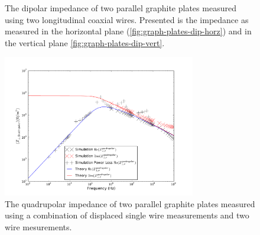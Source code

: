 \begin{figure}
\caption{The dipolar impedance of two parallel graphite plates measured using two longitudinal coaxial wires. Presented is the impedance as measured in the horizontal plane (\ref{fig:graph-plates-dip-horz}) and in the vertical plane \ref{fig:graph-plates-dip-vert}.}
\label{fig:graph-plates-dipolar}
\end{figure}

\begin{figure}
\begin{center}
\includegraphics[width=0.75\textwidth]{Bench_Top_Measurements/figures/wire_meas/graphite_plates/quadrupolar-horizontal.pdf}
\end{center}
\caption{The quadrupolar impedance of two parallel graphite plates measured using a combination of displaced single wire measurements and two wire mesurements.}
\label{fig:graph-plates-quadrupolar}
\end{figure}

